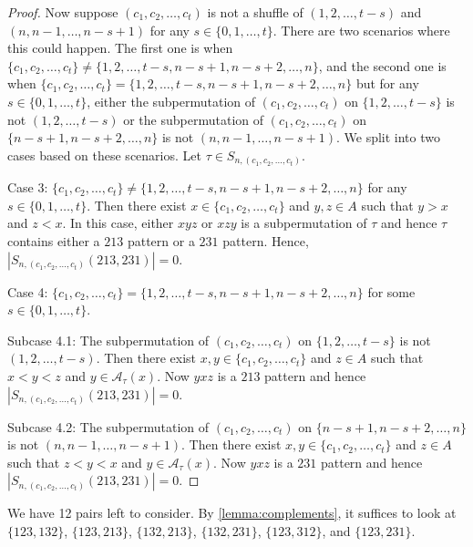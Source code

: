 \documentclass[11pt]{article}
\theoremstyle{definition}
\numberwithin{equation}{section}
\begin{document}
\begin{proof}
Now suppose $(c_1,c_2,\ldots,c_t)$ is not a shuffle of $(1,2,\ldots,t-s)$ and $(n,n-1,\ldots,n-s+1)$ for any $s\in\{0,1,\ldots,t\}$. There are two scenarios where this could happen. The first one is when $\{c_1,c_2,\ldots,c_t\}\neq \{1,2,\ldots,t-s,n-s+1,n-s+2,\ldots,n\}$, and the second one is when $\{c_1,c_2,\ldots,c_t\}=\{1,2,\ldots,t-s,n-s+1,n-s+2,\ldots,n\}$ but for any $s\in\{0,1,\ldots,t\}$, either the subpermutation of $(c_1,c_2,\ldots,c_t)$ on $\{1,2,\ldots,t-s\}$ is not $(1,2,\ldots,t-s)$ or the subpermutation of $(c_1,c_2,\ldots,c_t)$ on $\{n-s+1,n-s+2,\ldots,n\}$ is not $(n,n-1,\ldots,n-s+1)$. We split into two cases based on these scenarios. Let $\tau\in S_{n,(c_1,c_2,\ldots,c_t)}$.

Case 3: $\{c_1,c_2,\ldots,c_t\}\neq \{1,2,\ldots,t-s,n-s+1,n-s+2,\ldots,n\}$ for any $s\in\{0,1,\ldots,t\}$. Then there exist $x\in\{c_1,c_2,\ldots,c_t\}$ and $y,z\in A$ such that $y>x$ and $z<x$. In this case, either $xyz$ or $xzy$ is a subpermutation of $\tau$ and hence $\tau$ contains either a $213$ pattern or a $231$ pattern. Hence, $|S_{n,(c_1,c_2,\ldots,c_t)}(213,231)|=0$. 

Case 4: $\{c_1,c_2,\ldots,c_t\}=\{1,2,\ldots,t-s,n-s+1,n-s+2,\ldots,n\}$ for some $s\in\{0,1,\ldots,t\}$. 

Subcase 4.1: The subpermutation of $(c_1,c_2,\ldots,c_t)$ on $\{1,2,\ldots,t-s\}$ is not $(1,2,\ldots,t-s)$. Then there exist $x,y\in\{c_1,c_2,\ldots,c_t\}$ and $z\in A$ such that $x<y<z$ and $y\in\mathcal{A}_\tau(x)$. Now $yxz$ is a $213$ pattern and hence $|S_{n,(c_1,c_2,\ldots,c_t)}(213,231)|=0$.

Subcase 4.2: The subpermutation of $(c_1,c_2,\ldots,c_t)$ on $\{n-s+1,n-s+2,\ldots,n\}$ is not $(n,n-1,\ldots,n-s+1)$. Then there exist $x,y\in\{c_1,c_2,\ldots,c_t\}$ and $z\in A$ such that $z<y<x$ and $y\in\mathcal{A}_\tau (x)$. Now $yxz$ is a $231$ pattern and hence $|S_{n,(c_1,c_2,\ldots,c_t)}(213,231)|=0$.
\end{proof}

We have 12 pairs left to consider. By \cref{lemma:complements}, it suffices to look at $\{123,132\}$, $\{123,213\}$, $\{132,213\}$, $\{132,231\}$, $\{123,312\}$, and $\{123,231\}$.
\end{document}
